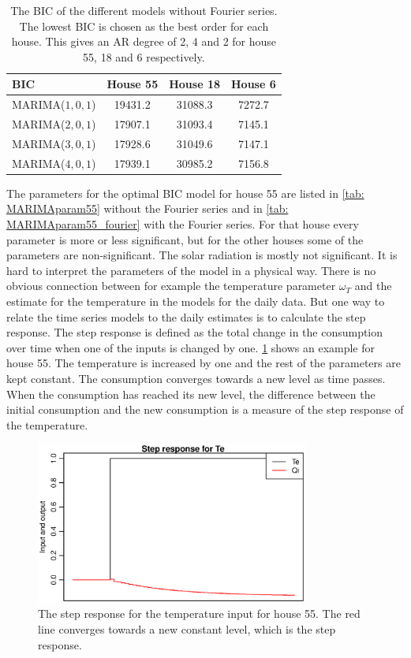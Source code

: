 \begin{table}[H]
    \centering
    \begin{tabular}{l|ccc}
    \hline
    \textbf{BIC} & House 55 & House 18 & House 6 \\ \hline \hline
    MARIMA($1,0,1$) & 19431.2 & 31088.3 & 7272.7 \\
    MARIMA($2,0,1$) & 17907.1 & 31093.4 & 7145.1 \\
    MARIMA($3,0,1$) & 17928.6 & 31049.6 & 7147.1 \\
    MARIMA($4,0,1$) & 17939.1 & 30985.2 & 7156.8 \\
    \hline
    \end{tabular}
    \caption{The BIC of the different models without Fourier series. The lowest BIC is chosen as the best order for each house. This gives an AR degree of 2, 4 and 2 for house 55, 18 and 6 respectively.}
      \label{tab: BIC}
\end{table}

\noindent The parameters for the optimal BIC model for house 55 are listed in \cref{tab: MARIMAparam55} without the Fourier series and in \cref{tab: MARIMAparam55_fourier} with the Fourier series. For that house every parameter is more or less significant, but for the other houses some of the parameters are non-significant. The solar radiation is mostly not significant. It is hard to interpret the parameters of the model in a physical way. There is no obvious connection between for example the temperature parameter $\omega_T$ and the estimate for the temperature in the models for the daily data. But one way to relate the time series models to the daily estimates is to calculate the step response. The step response is defined as the total change in the consumption over time when one of the inputs is changed by one. \cref{fig:StepResponse55} shows an example for house 55. The temperature is increased by one and the rest of the parameters are kept constant. The consumption converges towards a new level as time passes. When the consumption has reached its new level, the difference between the initial consumption and the new consumption is a measure of the step response of the temperature.


\begin{figure}
    \centering
    \includegraphics[width=0.8\textwidth]{../../../figures/StepResponse.eps}
    \caption{The step response for the temperature input for house 55. The red line converges towards a new constant level, which is the step response.}
    \label{fig:StepResponse55}
\end{figure}


